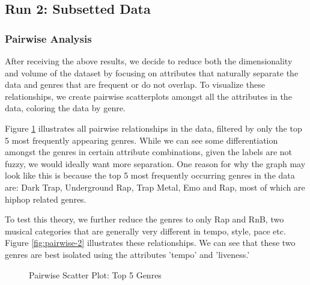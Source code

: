 \documentclass[conference]{IEEEtran}
\begin{document}
\subsection{Run 2: Subsetted Data}

\subsubsection{Pairwise Analysis}
After receiving the above results, we decide to reduce both the dimensionality and volume of the dataset by focusing on attributes that naturally separate the data and genres that are frequent or do not overlap. To visualize these relationships, we create pairwise scatterplots amongst all the attributes in the data, coloring the data by genre. 

Figure \ref{fig:pairwise-top-5} illustrates all pairwise relationships in the data, filtered by only the top 5 most frequently appearing genres. While we can see some differentiation amongst the genres in certain attribute combinations, given the labels are not fuzzy, we would ideally want more separation. One reason for why the graph may look like this is because the top 5 most frequently occurring genres in the data are: Dark Trap, Underground Rap, Trap Metal, Emo and Rap, most of which are hiphop related genres. 

To test this theory, we further reduce the genres to only Rap and RnB, two musical categories that are generally very different in tempo, style, pace etc. Figure \ref{fig:pairwise-2} illustrates these relationships. We can see that these two genres are best isolated using the attributes 'tempo' and 'liveness.' 

 \begin{figure}[!ht]
    \begin{center}
    \end{center}
    \caption{Pairwise Scatter Plot: Top 5 Genres}
    \label{fig:pairwise-top-5}
\end{figure}
\end{document}
